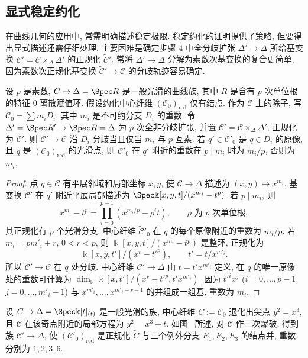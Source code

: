 \subsection{显式稳定约化}\label{src:6.5.2-subsection}
在曲线几何的应用中, 常需明确描述稳定极限. 稳定约化的证明提供了策略, 但要得出显式描述还需仔细处理. 主要困难是确定步骤 $4$ 中全分歧扩张 $\Delta'\to\Delta$ 所给基变换 $\mathcal C'=\mathcal C\times_\Delta\Delta'$ 的正规化 $\widetilde{\mathcal C}'$. 常将 $\Delta'\to\Delta$ 分解为素数次基变换的复合更简单, 因为素数次正规化基变换 $\widetilde{\mathcal C}'\to\mathcal C$ 的分歧轨迹容易确定.
\begin{proposition}\label{src:6.5.12}
设 $p$ 是素数, $\mathcal C\to\Delta=\Spec R$ 是一般光滑的曲线族, 其中 $R$ 是含有 $p$ 次单位根的特征 $0$ 离散赋值环. 假设约化中心纤维 $(\mathcal C_0)_{\mathrm{red}}$ 仅有结点. 作为 $\mathcal C$ 上的除子, 写 $\mathcal C_0=\sum m_iD_i$, 其中 $m_i$ 是不可约分支 $D_i$ 的重数. 令 $\Delta'=\Spec R'\to\Spec R=\Delta$ 为 $p$ 次全非分歧扩张, 并置 $\mathcal C'=\mathcal C\times_\Delta\Delta'$, 正规化为 $\widetilde{\mathcal C}'$. 则 $\widetilde{\mathcal C}'\to\mathcal C$ 沿 $D_i$ 分歧当且仅当 $m_i$ 与 $p$ 互素. 若 $q'\in\widetilde{\mathcal C}'_0$ 是 $q\in D_i$ 的原像, 且 $q$ 是 $(\mathcal C_0)_{\mathrm{red}}$ 的光滑点, 则 $\widetilde{\mathcal C}'_0$ 在 $q'$ 附近的重数在 $p\mid m_i$ 时为 $m_i/p$, 否则为 $m_i$.
\end{proposition}
\begin{proof}
点 $q\in\mathcal C$ 有平展邻域和局部坐标 $x,\allowbreak y$, 使 $\mathcal C\to\Delta$ 描述为 $(x,\allowbreak y)\mapsto x^{m_i}$. 基变换 $\mathcal C'$ 在 $q'$ 附近平展局部描述为 $\Spec\Bbbk[x,\allowbreak y,\allowbreak t]/(x^{m_i}-t^p)$. 若 $p\mid m_i$, 则
\[
x^{m_i}-t^p=\prod_{i=0}^{p-1}(x^{m_i/p}-\rho^it),
\qquad\rho\text{ 为 }p\text{ 次单位根},
\]
其正规化有 $p$ 个光滑分支. 中心纤维 $\widetilde{\mathcal C}'_0$ 在 $q$ 的每个原像附近的重数为 $m_i/p$. 若 $m_i=pm'_i+r$, $0<r<p$, 则 $\Bbbk[x,\allowbreak y,\allowbreak t]/(x^{m_i}-t^p)$ 是整环, 正规化为
\[
\Bbbk[x,y,t']/(x^r-t'^p),\qquad t'=t/x^{m'_i}.
\]
所以 $\widetilde{\mathcal C}'\to\mathcal C$ 在 $q$ 处分歧. 中心纤维 $\widetilde{\mathcal C}'\to\Delta$ 由 $t=t'x^{m'_i}$ 定义, 在 $q$ 的唯一原像处的重数可计算为 $\dim_{\Bbbk}\Bbbk[x,\allowbreak t']/(x^r-t'^p,\allowbreak t'x^{m'_i})$. 因为 $t'^ix^j$ ($i=0,\allowbreak \ldots,\allowbreak p-1$, $j=0,\allowbreak \ldots,\allowbreak m'_i-1$) 与 $x^{m'_i},\allowbreak \ldots,\allowbreak x^{m'_i+r-1}$ 的并组成一组基, 重数为 $m_i$.
\end{proof}
\begin{example}[尖点的稳定约化]\label{src:6.5.13}
设 $\mathcal C\to\Delta=\Spec\Bbbk[t]_{(t)}$ 是一般光滑的族, 中心纤维 $C:=\mathcal C_0$ 退化出尖点 $y^2=x^3$, 且 $\mathcal C$ 在该奇点附近的局部方程为 $y^2=x^3+t$. 如图~ 所述, 对 $\mathcal C$ 作三次爆破, 得到族 $\mathcal C'\to\Delta$, 使 $(\mathcal C'_0)_{\mathrm{red}}$ 是正规化 $\widetilde C$ 与三个例外分支 $E_1,\allowbreak E_2,\allowbreak E_3$ 的结点并, 重数分别为 $1,\allowbreak 2,\allowbreak 3,\allowbreak 6$.
\end{example}
